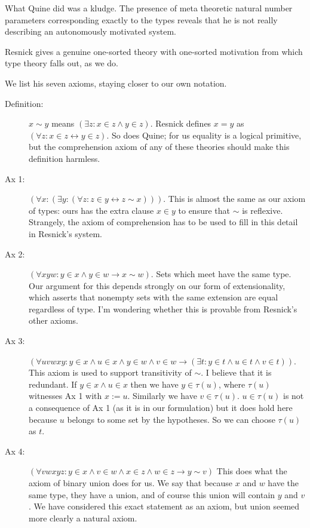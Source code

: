 \documentclass[12pt]{article}
\begin{document}
What Quine did was a kludge.  The presence of meta theoretic natural number parameters corresponding exactly to the types
reveals that he is not really describing an autonomously motivated system.

Resnick gives a genuine one-sorted theory with one-sorted motivation from which type theory falls out, as we do.

We list his seven axioms, staying closer to our own notation.

\begin{description}

\item[Definition:]  $x \sim y$ means $(\exists z:x \in z \wedge y \in z)$.  Resnick defines
$x=y$ as $(\forall z:x \in z \leftrightarrow y \in z)$.  So does Quine; for us equality is a logical primitive, but the comprehension axiom
of any of these theories should make this definition harmless.

\item[Ax 1:]  $(\forall x:(\exists y:(\forall z:z \in y \leftrightarrow z \sim x)))$.  This is almost the same as our axiom of types:  ours has the extra clause $x \in y$ to ensure that $\sim$ is reflexive.  Strangely, the axiom of comprehension has to be used to fill in this detail in Resnick's system.

\item[Ax 2:] $(\forall xyw:y \in x \wedge y \in w \rightarrow x \sim w)$.  Sets which meet have the same type.   Our argument for this depends strongly on our form of extensionality, which asserts that nonempty sets with the same extension are equal regardless of type.  I'm wondering whether this is provable from Resnick's other axioms.  

\item[Ax 3:]  $(\forall uvwxy:  y \in x \wedge u \in x \wedge y \in w \wedge v \in w \rightarrow (\exists t:y \in t \wedge u \in t \wedge v \in t))$.  This axiom is used to support transitivity of $\sim$.  I believe that it is redundant.  If $y \in x \wedge u \in x$ then we have $y \in \tau(u)$, where $\tau(u)$ witnesses
Ax 1 with $x := u$.  Similarly we have $v \in \tau(u)$.  $u \in \tau(u)$ is not a consequence of Ax 1 (as it is in our formulation) but it does hold here because
$u$ belongs to some set by the hypotheses.  So we can choose $\tau(u)$ as $t$.

\item[Ax 4:]  $(\forall vwxyz:y \in x \wedge v \in w \wedge x \in z \wedge w \in z \rightarrow y \sim v)$  This does what the axiom of binary union does for us.  We say that because $x$ and $w$ have the same type, they have a union, and of course this union will contain $y$ and $v$.  We have considered this exact statement as an axiom, but union seemed more clearly a natural axiom.


\end{description}
\end{document}
